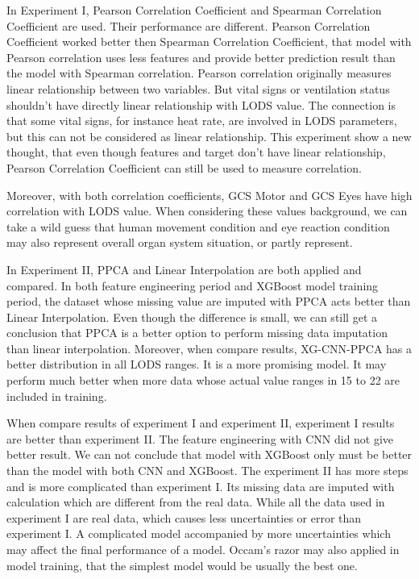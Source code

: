 \documentclass[12pt,a4paper,english
]{tunithesis}
\begin{document}
In Experiment I, Pearson Correlation Coefficient and Spearman Correlation Coefficient are used. Their performance are different. Pearson Correlation Coefficient worked better then Spearman Correlation Coefficient, that model with Pearson correlation uses less features and provide better prediction result than the model with Spearman correlation. Pearson correlation originally measures linear relationship between two variables. But vital signs or ventilation status shouldn't have directly linear relationship with LODS value. The connection is that some vital signs, for instance heat rate, are involved in LODS parameters, but this can not be considered as linear relationship. This experiment show a new thought, that even though features and target don't have linear relationship, Pearson Correlation Coefficient can still be used to measure correlation.

Moreover, with both correlation coefficients, GCS Motor and GCS Eyes have high correlation with LODS value. When considering these values background, we can take a wild guess that human movement condition and eye reaction condition may also represent overall organ system situation, or partly represent. 

In Experiment II, PPCA and Linear Interpolation are both applied and compared. In both feature engineering  period and XGBoost model training period, the dataset whose missing value are imputed with PPCA acts better than Linear Interpolation. Even though the difference is small, we can still get a conclusion that PPCA is a better option to perform missing data imputation than linear interpolation. Moreover, when compare results, XG-CNN-PPCA has a better distribution in all LODS ranges. It is a more promising model. It may perform much better when more data whose actual value ranges in 15 to 22 are included in training.

When compare results of experiment I and experiment II, experiment I results are better than experiment II. The feature engineering with CNN did not give better result. We can not conclude that model with XGBoost only must be better than the model with both CNN and XGBoost. The experiment II has more steps and is more complicated than experiment I. Its missing data are imputed with calculation which are different from the real data. While all the data used in experiment I are real data, which causes less uncertainties or error than experiment I. A complicated model accompanied by more uncertainties which may affect the final performance of a model. Occam's razor may also applied in model training, that the simplest model would be usually the best one.
\end{document}
